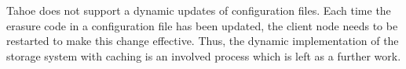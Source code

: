 
Tahoe does not support a dynamic updates of configuration files. Each time the erasure code in a configuration file has been updated, the client node needs to be restarted to make this change effective. Thus, the dynamic implementation of the storage system with caching is an involved process which is left as a further work.


